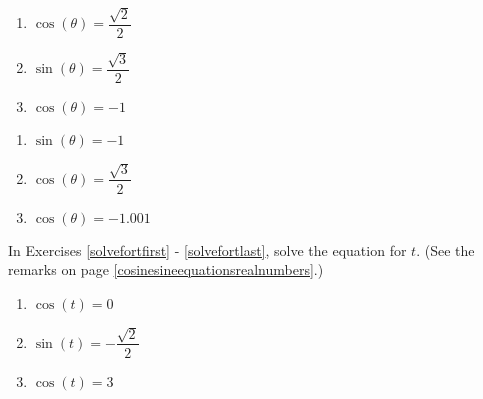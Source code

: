 \begin{multicols}{3}

\begin{enumerate}

\setcounter{enumi}{\value{HW}}

\item $\cos(\theta) = \dfrac{\sqrt{2}}{2}$
\item $\sin(\theta) = \dfrac{\sqrt{3}}{2}$
\item $\cos(\theta) = -1$ 

\setcounter{HW}{\value{enumi}}

\end{enumerate}

\end{multicols}

\begin{multicols}{3}

\begin{enumerate}

\setcounter{enumi}{\value{HW}}

\item  $\sin(\theta) = -1$ 
\item  $\cos(\theta) = \dfrac{\sqrt{3}}{2}$
\item  $\cos(\theta) = -1.001$  \label{solveforanglelast}

\setcounter{HW}{\value{enumi}}

\end{enumerate}

\end{multicols}

In Exercises \ref{solvefortfirst} - \ref{solvefortlast}, solve the equation for $t$.  (See the remarks on page \ref{cosinesineequationsrealnumbers}.)

\begin{multicols}{3}

\begin{enumerate}

\setcounter{enumi}{\value{HW}}

\item $\cos(t) = 0$  \label{solvefortfirst}
\item $\sin(t) = -\dfrac{\sqrt{2}}{2}$
\item $\cos(t) = 3$ 

\setcounter{HW}{\value{enumi}}

\end{enumerate}

\end{multicols}

